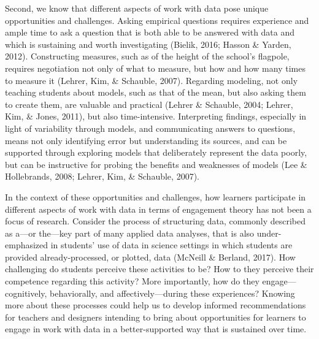 \documentclass[]{book}
\theoremstyle{definition}
\theoremstyle{definition}
\theoremstyle{definition}
\theoremstyle{remark}
\begin{document}
Second, we know that different aspects of work with data pose unique
opportunities and challenges. Asking empirical questions requires
experience and ample time to ask a question that is both able to be
answered with data and which is sustaining and worth investigating
(Bielik, 2016; Hasson \& Yarden, 2012). Constructing measures, such as
of the height of the school's flagpole, requires negotiation not only of
what to measure, but how and how many times to measure it (Lehrer, Kim,
\& Schauble, 2007). Regarding modeling, not only teaching students about
models, such as that of the mean, but also asking them to create them,
are valuable and practical (Lehrer \& Schauble, 2004; Lehrer, Kim, \&
Jones, 2011), but also time-intensive. Interpreting findings, especially
in light of variability through models, and communicating answers to
questions, means not only identifying error but understanding its
sources, and can be supported through exploring models that deliberately
represent the data poorly, but can be instructive for probing the
benefits and weaknesses of models (Lee \& Hollebrands, 2008; Lehrer,
Kim, \& Schauble, 2007).

In the context of these opportunities and challenges, how learners
participate in different aspects of work with data in terms of
engagement theory has not been a focus of research. Consider the process
of structuring data, commonly described as a---or the---key part of many
applied data analyses, that is also under-emphasized in students' use of
data in science settings in which students are provided
already-processed, or plotted, data (McNeill \& Berland, 2017). How
challenging do students perceive these activities to be? How to they
perceive their competence regarding this activity? More importantly, how
do they engage---cognitively, behaviorally, and affectively---during
these experiences? Knowing more about these processes could help us to
develop informed recommendations for teachers and designers intending to
bring about opportunities for learners to engage in work with data in a
better-supported way that is sustained over time.
\end{document}
